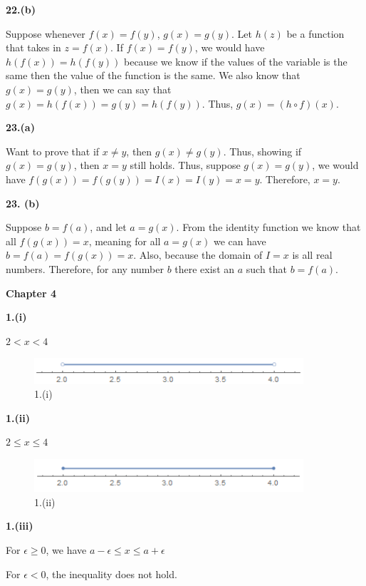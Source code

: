 \documentclass[a4paper,12pt]{report}
\begin{document}
\noindent
\textbf{22.(b)}

\noindent
Suppose whenever $f(x)=f(y)$, $g(x)=g(y)$. Let $h(z)$ be a function that takes in $z=f(x)$. If $f(x)=f(y)$, we would have $h(f(x))=h(f(y))$ because we know if the values of the variable is the same then the value of the function is the same. We also know that $g(x)=g(y)$, then we can say that $g(x)=h(f(x))=g(y)=h(f(y))$. Thus, $g(x)=(h\circ f)(x)$. 

\noindent
\textbf{23.(a)}

\noindent
Want to prove that if $x\neq y$, then $g(x)\neq g(y)$. Thus, showing if $g(x)=g(y)$, then $x=y$ still holds. Thus, suppose $g(x)=g(y)$, we would have $f(g(x))=f(g(y))=I(x)=I(y)=x=y$. Therefore, $x=y$.

\noindent
\textbf{23. (b)}

\noindent
Suppose $b=f(a)$, and let $a=g(x)$. From the identity function we know that all $f(g(x))=x$, meaning for all $a=g(x)$ we can have $b=f(a)=f(g(x))=x$. Also, because the domain of $I=x$ is all real numbers. Therefore, for any number $b$ there exist an $a$ such that $b=f(a)$.

\pagebreak
\noindent
\textbf{Chapter 4}

\noindent
\textbf{1.(i)}

\noindent
$2<x<4$

\begin{figure}[h]
  \centering
  \includegraphics[width=10cm]{Pics/Chap41(i).png}
  \caption{1.(i)}
\end{figure}

\noindent
\textbf{1.(ii)}

\noindent
$2\leq x\leq4$

\begin{figure}[h]
  \centering
  \includegraphics[width=10cm]{Pics/Chap41(ii).png}
  \caption{1.(ii)}
\end{figure}

\noindent
\textbf{1.(iii)}

\noindent
For $\epsilon \geq 0$, we have $a-\epsilon \leq x \leq a+\epsilon$

\noindent
For $\epsilon < 0$, the inequality does not hold. 
\end{document}
